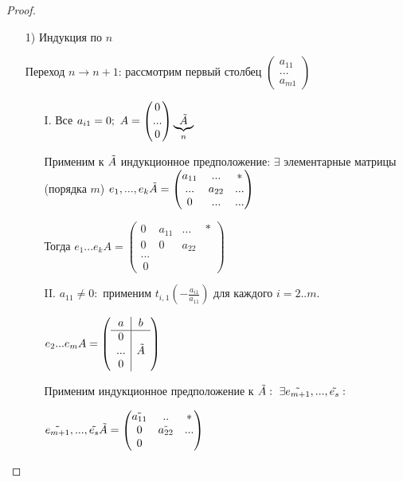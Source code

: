 \begin{proof}

\begin{enumerate}
    \item[1)] Индукция по $n$

    Переход $n\rightarrow n + 1$: рассмотрим первый столбец 
$\begin{pmatrix}
        a_{11} \\ ... \\ a_{m1}
    \end{pmatrix}$

    \begin{enumerate}
        \item[I.] Все $a_{i1}=0;\ A=\begin{pmatrix}
            0 \\ ... \\ 0
        \end{pmatrix}\underbrace{\Tilde{A}}_{n}$

        Применим к $\Tilde{A}$ индукционное предположение: $\exists$ 
элементарные матрицы (порядка $m$) $e_1,...,e_k\Tilde{A}=\begin{pmatrix}
            a_{11} & ... & * \\ ... & a_{22} & ... \\ 0 & ... & ...
        \end{pmatrix}$

        Тогда $e_1...e_kA=\begin{pmatrix}
            0 & a_{11} & ... &  * \\ 0 & 0 & a_{22} \\ ... \\\ 0
        \end{pmatrix}$
        \item[II.] $a_{11}\neq 0:$ применим 
$t_{i,1}(-\frac{a_{i1}}{a_{11}})$ для каждого $i=2..m$.

        $e_2...e_mA=\left(\begin{array}{c|c}a & b\\ \hline 0  \\ ... & 
\Tilde{A} \\ 0 \end{array}\right)$

        Применим индукционное предположение к $\Tilde{A}:\ \exists 
\Tilde{e_{m+1}},...,\Tilde{e_s}:$ 
        
        $ \Tilde{e_{m+1}},...,\Tilde{e_s}\Tilde{A}=\begin{pmatrix}
            \Tilde{a_{11}} & .. & * \\ 0 & \Tilde{a_{22}} & ... \\ 0
        \end{pmatrix}$


\end{enumerate}
\end{enumerate}
\end{proof}

